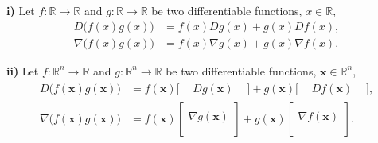 \documentclass[12pt,thmsa]{article}
\begin{document}
\textbf{i)} Let \(f: \mathbb{R} \rightarrow \mathbb{R}\) and \(g: \mathbb{R} \rightarrow \mathbb{R}\) be two differentiable functions, \(x \in \mathbb{R}\),
\[ 
\begin{aligned}
	D \bigg (f(x) g(x) \bigg )
	& = f(x)  D g(x)
	+g(x)  D f(x),  \\
	\nabla \bigg (f(x) g(x) \bigg )
	& = f(x)  \nabla g(x)
	+g(x)  \nabla f(x). 
\end{aligned}
\]

\noindent
\textbf{ii)} Let \(f: \mathbb{R}^{n} \rightarrow \mathbb{R}\) and \(g: \mathbb{R}^{n} \rightarrow \mathbb{R}\) be two differentiable functions, \(\boldsymbol{x} \in \mathbb{R}^{n}\),
\[ 
\begin{aligned}
	D \bigg (f(\boldsymbol{x}) g(\boldsymbol{x}) \bigg )
	& = f(\boldsymbol{x}) \big [\begin{array}{ccc}
		&D g(\boldsymbol{x}) & \end{array} \big ] 
	+g(\boldsymbol{x}) \big [\begin{array}{ccc} & D f(\boldsymbol{x}) &
	\end{array} \big ], \\
	\nabla \bigg (f(\boldsymbol{x}) g(\boldsymbol{x}) \bigg )
	& = f(\boldsymbol{x}) \left [\begin{array}{c}
		\\ \nabla g(\boldsymbol{x}) \\  \\ \end{array} \right ] 
	+g(\boldsymbol{x}) \left [\begin{array}{c} \\ \nabla f(\boldsymbol{x}) \\ \\
	\end{array} \right ].
\end{aligned}
\]
\end{document}
